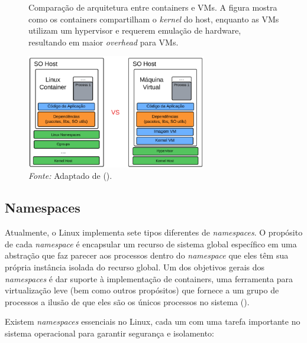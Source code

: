 \begin{figure}[htbp]
  \centering
  \caption{Comparação de arquitetura entre containers e VMs. A figura mostra como os containers compartilham o \textit{kernel} do host, enquanto as VMs utilizam um hypervisor e requerem emulação de hardware, resultando em maior \textit{overhead} para VMs.}
  \includegraphics[width=0.7\textwidth]{images/vm_x_container_2.png}
  \caption*{\textit{Fonte:} Adaptado de (\cite{OCIContainer}).}
  \label{fig:vm_x_container}
\end{figure}


\subsection{Namespaces}

Atualmente, o Linux implementa sete tipos diferentes de \textit{namespaces}. O propósito de cada \textit{namespace} é encapsular um recurso de sistema global específico em uma abstração que faz parecer aos processos dentro do \textit{namespace} que eles têm sua própria instância isolada do recurso global. Um dos objetivos gerais dos \textit{namespaces} é dar suporte à implementação de containers, uma ferramenta para virtualização leve (bem como outros propósitos) que fornece a um grupo de processos a ilusão de que eles são os únicos processos no sistema (\cite{LWNNamespaces}).

Existem \textit{namespaces} essenciais no Linux, cada um com uma tarefa importante no sistema operacional para garantir segurança e isolamento:

